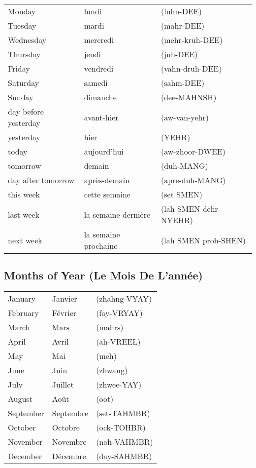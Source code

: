 \begin{tabular}{| l | l | l |}
\hline
Monday    & lundi     & (luhn-DEE)      \\
Tuesday   & mardi     & (mahr-DEE)      \\
Wednesday & mercredi  & (mehr-kruh-DEE) \\
Thursday  & jeudi     & (juh-DEE)       \\
Friday    & vendredi  & (vahn-druh-DEE) \\
Saturday  & samedi    & (sahm-DEE)      \\
Sunday    & dimanche  & (dee-MAHNSH)    \\
\hline
\hline
day before yesterday & avant-hier & (aw-van-yehr) \\
yesterday & hier        & (YEHR)          \\
today     & aujourd'hui & (aw-zhoor-DWEE) \\
tomorrow  & demain      & (duh-MANG)    \\
day after tomorrow & apr\`{e}s-demain & (apre-duh-MANG) \\
this week & cette semaine & (set SMEN)  \\
last week & la semaine dernière   & (lah SMEN dehr-NYEHR)\\
next week & la semaine prochaine  & (lah SMEN proh-SHEN)  \\
\hline
\end{tabular}

\subsection{Months of Year (Le Mois De L'ann\'ee)}

\begin{tabular}{| l | l | l |}
\hline
January     & Janvier       & (zhahng-VYAY) \\
February    & F\'evrier     & (fay-VRYAY)   \\
March       & Mars          & (mahrs)       \\
April       & Avril         & (ah-VREEL)    \\
May         & Mai           & (meh)         \\
June        & Juin          & (zhwang)      \\
July        & Juillet       & (zhwee-YAY)   \\
August      & Ao\^ut        & (oot)         \\
September   & Septembre     & (set-TAHMBR)  \\
October     & Octobre       & (ock-TOHBR)   \\
November    & Novembre      & (noh-VAHMBR)  \\
December    & D\'ecembre    & (day-SAHMBR)  \\
\hline
\end{tabular}


